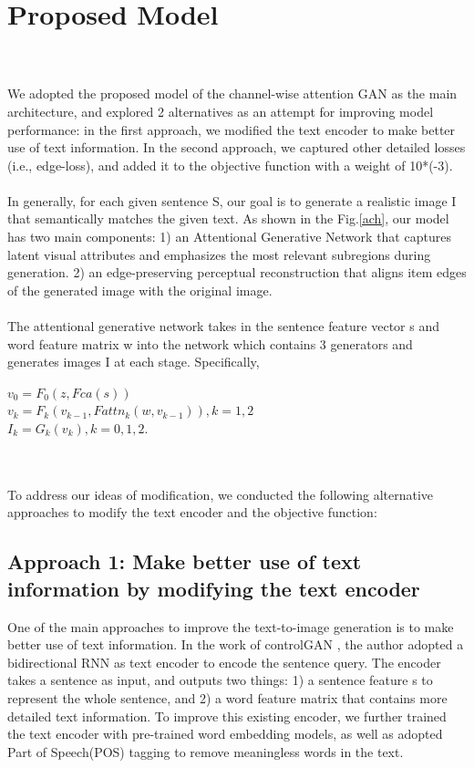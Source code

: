 \documentclass[10pt,twocolumn,letterpaper]{article}
\begin{document}
\section{Proposed Model}
\\\\
\noindent We adopted the proposed model of the channel-wise attention GAN as the main architecture, and explored 2 alternatives as an attempt for improving model performance: in the first approach, we modified the text encoder to make better use of text information. In the second approach, we captured other detailed losses (i.e., edge-loss), and added it to the objective function with a weight of 10*(-3).     
\\\\
In generally, for each given sentence S, our goal is to generate a realistic image I that semantically matches the given text. As shown in the Fig.\ref{ach}, our model has two main components: 1) an Attentional Generative Network that captures latent visual attributes and emphasizes the most relevant subregions during generation. 2) an edge-preserving perceptual reconstruction that aligns item edges of the generated image with the original image. 
\\\\
The attentional generative network takes in the sentence feature vector s and word feature matrix w into the network which contains 3 generators and generates images I at each stage. Specifically, \\
\begin{center}
    $v_0 = F_0(z,Fca(s))$\\
    $v_k = F_k(v_{k-1}, Fattn_k(w, v_{k-1})), k = 1,2$\\
    $I_k = G_k(v_k), k = 0,1,2$.
\end{center}
\\\\
To address our ideas of modification, we conducted the following alternative approaches to modify the text encoder and the objective function: 

\subsection{Approach 1: Make better use of text information by modifying the text encoder}
\noindent One of the main approaches to improve the text-to-image generation is to make better use of text information. In the work of controlGAN \cite{li2019controllable}, the author adopted a bidirectional RNN \cite{xu2018attngan} as text encoder to encode the sentence query. The encoder takes a sentence as input, and outputs two things: 1) a sentence feature s to represent the whole sentence, and 2) a word feature matrix that contains more detailed text information. To improve this existing encoder, we further trained the text encoder with pre-trained word embedding models, as well as adopted Part of Speech(POS) tagging to remove meaningless words in the text.
\end{document}

